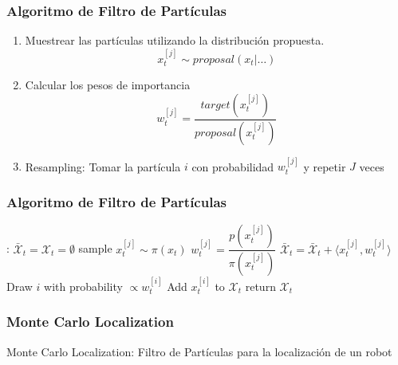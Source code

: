 \begin{frame}
    \frametitle{Algoritmo de Filtro de Partículas}

    \begin{enumerate}
        \item Muestrear las partículas utilizando la distribución propuesta.
        \begin{equation*}
            x_t^{[j]} \sim proposal(x_t | \ldots)
        \end{equation*}
        \item Calcular los pesos de importancia
        \begin{equation*}
            w_t^{[j]} = \frac{target(x_t^{[j]})}{proposal(x_t^{[j]})}
        \end{equation*}
        \item Resampling: Tomar la partícula $i$ con probabilidad $w_t^{[j]}$ y repetir $J$ veces 
    \end{enumerate}
\end{frame}

\begin{frame}
    \frametitle{Algoritmo de Filtro de Partículas}

    \begin{algorithmic}[1]
    :
    \State $\bar{\mathcal{X}}_t = \mathcal{X}_t = \emptyset$
        \State sample $x_t^{[j]} \sim \pi(x_t)$
        \State $w_t^{[j]} = \dfrac{p(x_t^{[j]})}{\pi(x_{t}^{[j]})}$
        \State $\bar{\mathcal{X}}_t = \bar{\mathcal{X}}_t + \langle x_t^{[j]}, w_t^{[j]}\rangle$
    \EndFor
        \State Draw $i$ with probability $\propto w_t^{[i]}$
        \State Add $x_t^{[i]}$ to $\mathcal{X}_t$
    \EndFor
    \State return $\mathcal{X}_t$
    \EndProcedure
    \end{algorithmic}
\end{frame}


\begin{frame}
    \frametitle{Monte Carlo Localization}

    Monte Carlo Localization: Filtro de Partículas para la localización de un robot

\end{frame}


